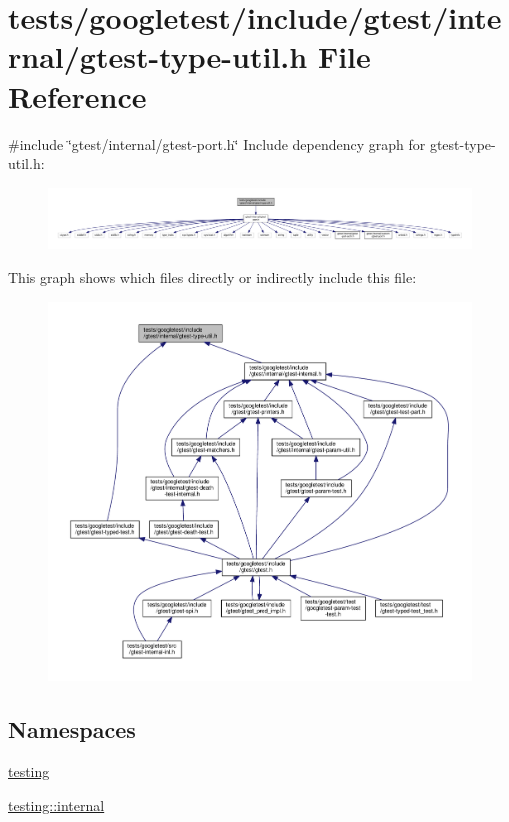 \hypertarget{gtest-type-util_8h}{}\section{tests/googletest/include/gtest/internal/gtest-\/type-\/util.h File Reference}
\label{gtest-type-util_8h}
{\ttfamily \#include \char`\"{}gtest/internal/gtest-\/port.\+h\char`\"{}}\newline
Include dependency graph for gtest-\/type-\/util.h\+:\nopagebreak
\begin{figure}[H]
\begin{center}
\leavevmode
\includegraphics[width=350pt]{gtest-type-util_8h__incl}
\end{center}
\end{figure}
This graph shows which files directly or indirectly include this file\+:\nopagebreak
\begin{figure}[H]
\begin{center}
\leavevmode
\includegraphics[width=350pt]{gtest-type-util_8h__dep__incl}
\end{center}
\end{figure}
\subsection*{Namespaces}
\begin{DoxyCompactItemize}
\item 
 \hyperlink{namespacetesting}{testing}
\item 
 \hyperlink{namespacetesting_1_1internal}{testing\+::internal}
\end{DoxyCompactItemize}
